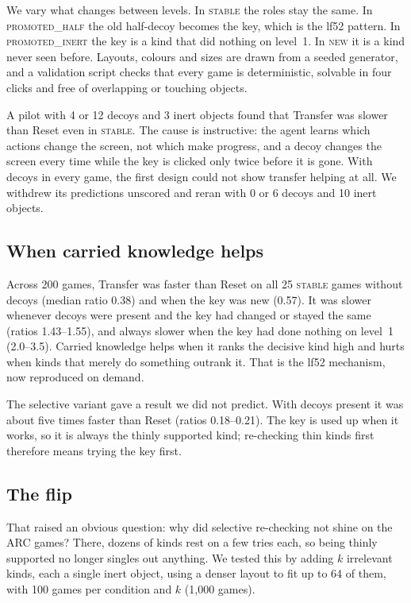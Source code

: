 \documentclass[11pt,a4paper]{article}
\begin{document}
We vary what changes between levels. In \textsc{stable} the roles stay the same. In \textsc{promoted\_half} the old half-decoy becomes the key, which is the lf52 pattern. In \textsc{promoted\_inert} the key is a kind that did nothing on level~1. In \textsc{new} it is a kind never seen before. Layouts, colours and sizes are drawn from a seeded generator, and a validation script checks that every game is deterministic, solvable in four clicks and free of overlapping or touching objects.

A pilot with 4 or 12 decoys and 3 inert objects found that Transfer was slower than Reset even in \textsc{stable}. The cause is instructive: the agent learns which actions change the screen, not which make progress, and a decoy changes the screen every time while the key is clicked only twice before it is gone. With decoys in every game, the first design could not show transfer helping at all. We withdrew its predictions unscored and reran with 0 or 6 decoys and 10 inert objects.

\subsection{When carried knowledge helps}

Across 200 games, Transfer was faster than Reset on all 25 \textsc{stable} games without decoys (median ratio 0.38) and when the key was new (0.57). It was slower whenever decoys were present and the key had changed or stayed the same (ratios 1.43--1.55), and always slower when the key had done nothing on level~1 (2.0--3.5). Carried knowledge helps when it ranks the decisive kind high and hurts when kinds that merely do something outrank it. That is the lf52 mechanism, now reproduced on demand.

The selective variant gave a result we did not predict. With decoys present it was about five times faster than Reset (ratios 0.18--0.21). The key is used up when it works, so it is always the thinly supported kind; re-checking thin kinds first therefore means trying the key first.

\subsection{The flip}

That raised an obvious question: why did selective re-checking not shine on the ARC games? There, dozens of kinds rest on a few tries each, so being thinly supported no longer singles out anything. We tested this by adding $k$ irrelevant kinds, each a single inert object, using a denser layout to fit up to 64 of them, with 100 games per condition and $k$ (1,000 games).
\end{document}
